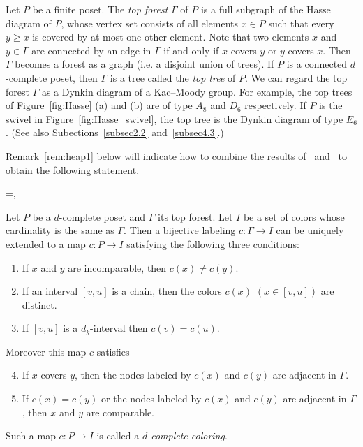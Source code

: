 Let $P$ be a finite poset.
The \emph{top forest} $\Gamma$ of $P$ is a full subgraph of 
the Hasse diagram of $P$, whose vertex set consists of all elements $x \in P$ 
such that every $y \ge x$ is covered by at most one other element. 
Note that two elements $x$ and $y \in \Gamma$ are connected by an edge in $\Gamma$ 
if and only if $x$ covers $y$ or $y$ covers $x$.
Then $\Gamma$ becomes a forest as a graph (i.e. a disjoint union of trees).
If $P$ is a connected $d$-complete poset, then $\Gamma$ is a tree called 
the \emph{top tree} of $P$.
We can regard the top forest $\Gamma$ as a Dynkin diagram of a Kac--Moody group.
For example, the top trees of Figure~\ref{fig:Hasse} (a) and (b) are
of type $A_8$ and $D_6$ respectively. 
If $P$ is the swivel in Figure~\ref{fig:Hasse_swivel}, the top tree is
the Dynkin diagram of type $E_6$.
(See also Subections~\ref{subsec2.2} and~\ref{subsec4.3}.)

Remark~\ref{rem:heap1} below will indicate how to combine the results 
of~\cite{Proc2} and~\cite{Stem2} to obtain the following statement.

\setbox\toto=\hbox{\cite[Proposition~8.6]{Proc2},~\cite[Proposition~3.1]{Stem2}}
\begin{prop}[\box\toto]
\label{prop:dc_color}
Let $P$ be a $d$-complete poset and $\Gamma$ its top forest.
Let $I$ be a set of colors whose cardinality is the same as $\Gamma$.
Then a bijective labeling $c : \Gamma \to I$ can be uniquely extended to a map 
$c : P \to I$ satisfying the following three conditions:
\begin{enumerate}[(C1)]
\item\label{prop2.5_C1} %
If $x$ and $y$ are incomparable, then $c(x) \neq c(y)$.
\item\label{prop2.5_C2} %
If an interval $[v,u]$ is a chain, then the colors $c(x)$ $(x \in [v,u])$ are 
distinct.
\item\label{prop2.5_C3} %
If $[v,u]$ is a $d_k$-interval then $c(v) = c(u)$.
\end{enumerate}
Moreover this map $c$ satisfies
\begin{enumerate}[(C1)]\setcounter{enumi}{3}
\item\label{prop2.5_C4} %
If $x$ covers $y$, then the nodes labeled by $c(x)$ and $c(y)$ are adjacent in $\Gamma$.
\item\label{prop2.5_C5} %
If $c(x) = c(y)$ or the nodes labeled by $c(x)$ and $c(y)$ are adjacent in $\Gamma$, 
then $x$ and $y$ are comparable.
\end{enumerate}
Such a map $c : P \to I$ is called a \emph{$d$-complete coloring}.
\end{prop}

